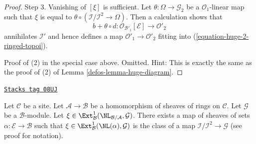 \begin{proof}
\medskip\noindent
Step 3. Vanishing of $[\xi]$ is sufficient. Let
$\theta : \Omega \to \mathcal{G}_2$ be a $\mathcal{O}_1$-linear map
such that $\xi$ is equal to
$\theta \circ (\mathcal{I}/\mathcal{I}^2 \to \Omega)$.
Then a calculation shows that
$$
b + \theta \circ d :
\mathcal{O}_{\mathcal{B}'_1}[\mathcal{E}]
\longrightarrow
\mathcal{O}'_2
$$
annihilates $\mathcal{I}'$ and hence defines a map
$\mathcal{O}'_1 \to \mathcal{O}'_2$ fitting into
(\ref{equation-huge-2-ringed-topoi}).

\medskip\noindent
Proof of (2) in the special case above. Omitted. Hint:
This is exactly the same as the proof of (2) of
Lemma \ref{defos-lemma-huge-diagram}.
\end{proof}

\begin{lemma}
\label{defos-lemma-NL-represent-ext-class-ringed-topoi}
\href{https://stacks.math.columbia.edu/tag/08UJ}{\texttt{Stacks tag 08UJ}}

Let $\mathcal{C}$ be a site. Let $\mathcal{A} \to \mathcal{B}$ be a
homomorphism of sheaves of rings on $\mathcal{C}$.
Let $\mathcal{G}$ be a $\mathcal{B}$-module.
Let
$\xi \in \Ext^1_\mathcal{B}(\NL_{\mathcal{B}/\mathcal{A}}, \mathcal{G})$.
There exists a map of sheaves of sets $\alpha : \mathcal{E} \to \mathcal{B}$
such that $\xi \in \Ext^1_\mathcal{B}(\NL(\alpha), \mathcal{G})$
is the class of a map $\mathcal{I}/\mathcal{I}^2 \to \mathcal{G}$
(see proof for notation).
\end{lemma}

